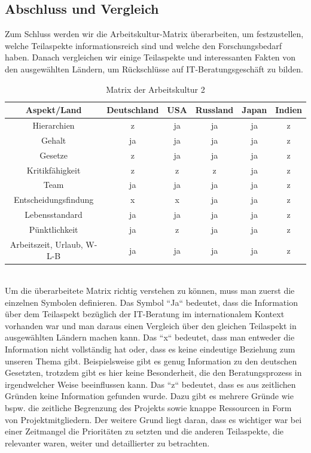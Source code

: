 \subsection{Abschluss und Vergleich}
Zum Schluss werden wir die Arbeitskultur-Matrix überarbeiten, um festzustellen, welche Teilaspekte informationsreich sind und welche den Forschungsbedarf haben. Danach vergleichen wir einige Teilaspekte und interessanten Fakten von den ausgewählten Ländern, um Rückschlüsse auf IT-Beratungsgeschäft zu bilden.
\begin{table}[htp]
\begin{tabular}{|c|c|c|c|c|c|}
\hline  Aspekt/Land& Deutschland & USA & Russland & Japan & Indien \\ 
\hline 	Hierarchien  & z & ja & ja & ja &  z \\ 
\hline  Gehalt& ja & ja & ja & ja & z \\ 
\hline  Gesetze& z & ja & ja & ja & z  \\ 
\hline  Kritikfähigkeit& z & z & z & ja & z \\ 
\hline  Team& ja & ja & ja & ja & z\\ 
\hline  Entscheidungsfindung& x & x & ja & ja & z  \\ 
\hline  Lebensstandard& ja & ja & ja & ja & z \\ 
\hline  Pünktlichkeit& ja & z & ja & ja & z\\ 
\hline  Arbeitszeit, Urlaub, W-L-B& ja & ja & ja & ja & z\\ 
\hline 
\end{tabular} 
\caption{Matrix der Arbeitskultur 2}
\end{table}	\\
Um die überarbeitete Matrix richtig verstehen zu können, muss man zuerst die einzelnen Symbolen definieren. Das Symbol ``Ja`` bedeutet, dass die Information über dem Teilaspekt bezüglich der IT-Beratung im internationalem Kontext vorhanden war und man daraus einen Vergleich über den gleichen Teilaspekt in ausgewählten Ländern machen kann. Das ``x`` bedeutet, dass man entweder die Information nicht vollständig hat oder, dass es keine eindeutige Beziehung zum unseren Thema gibt. Beispielsweise gibt es genug Information zu den deutschen Gesetzten, trotzdem gibt es hier keine Besonderheit, die den Beratungsprozess in irgendwelcher Weise beeinflussen kann. Das ``z`` bedeutet, dass es aus zeitlichen Gründen keine Information gefunden wurde. Dazu gibt es mehrere Gründe wie bspw. die zeitliche Begrenzung des Projekts sowie knappe Ressourcen in Form von Projektmitgliedern. Der weitere Grund liegt daran, dass es wichtiger war bei einer Zeitmangel die Prioritäten zu setzten und die anderen Teilaspekte, die relevanter waren, weiter und detaillierter zu betrachten.\\ \\
